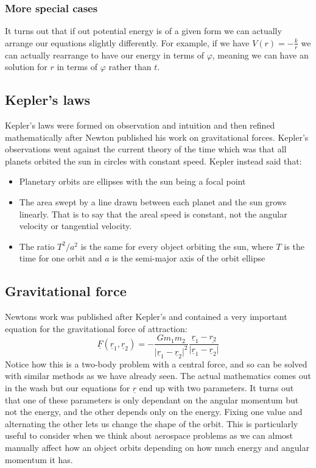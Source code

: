 \documentclass[12pt]{article}
\begin{document}
\subsubsection*{More special cases}
It turns out that if out potential energy is of a given form we can actually arrange our equations slightly differently. For example, if we have \(V(r)=-\frac{k}{r}\) we can actually rearrange to have our energy in terms of \(\varphi\), meaning we can have an solution for \(r\) in terms of \(\varphi\) rather than \(t\).
\subsection*{Kepler's laws}
Kepler's laws were formed on observation and intuition and then refined mathematically after Newton published his work on gravitational forces. Kepler's observations went against the current theory of the time which was that all planets orbited the sun in circles with constant speed. Kepler instead said that:
\begin{itemize}
    \item Planetary orbits are ellipses with the sun being a focal point
    \item The area swept by a line drawn between each planet and the sun grows linearly. That is to say that the areal speed is constant, not the angular velocity or tangential velocity.
    \item The ratio \(T^2/a^2\) is the same for every object orbiting the sun, where \(T\) is the time for one orbit and \(a\) is the semi-major axis of the orbit ellipse
\end{itemize}
\subsection*{Gravitational force}
Newtons work was published after Kepler's and contained a very important equation for the gravitational force of attraction:
\[\underline{F}(\underline{r}_1,\underline{r}_2)=-\frac{Gm_1m_2}{\vert \underline{r}_1-\underline{r}_2\vert^2}\frac{\underline{r}_1-\underline{r_2}}{\vert\underline{r}_1-\underline{r}_2\vert}\]
Notice how this is a two-body problem with a central force, and so can be solved with similar methods as we have already seen. The actual mathematics comes out in the wash but our equations for \(\underline{r}\) end up with two parameters. It turns out that one of these parameters is only dependant on the angular momentum but not the energy, and the other depends only on the energy. Fixing one value and alternating the other lets us change the shape of the orbit. This is particularly useful to consider when we think about aerospace problems as we can almost manually affect how an object orbits depending on how much energy and angular momentum it has.
\end{document}
